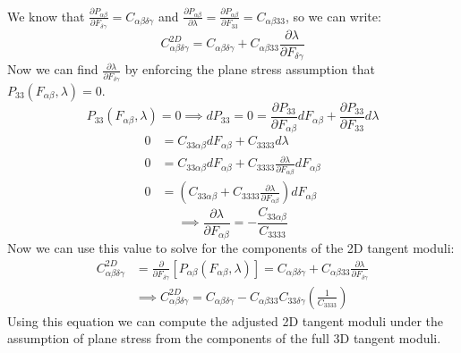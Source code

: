 \documentclass[]{spie}  %
\begin{document}
We know that $\frac{\partial P_{\alpha\beta}}{\partial F_{\delta\gamma}} = C_{\alpha\beta\delta\gamma}$ and $\frac{\partial P_{\alpha\beta}}{\partial \lambda} = \frac{\partial P_{\alpha\beta}}{\partial F_{33}} = C_{\alpha\beta 3 3}$, so we can write:
\begin{equation}
C^{2D}_{\alpha\beta\delta\gamma} = C_{\alpha\beta\delta\gamma} + C_{\alpha\beta 3 3} \frac{\partial \lambda}{\partial F_{\delta\gamma}}
\end{equation}
Now we can find $\frac{\partial \lambda}{\partial F_{\delta\gamma}}$ by enforcing the plane stress assumption that $P_{33}(F_{\alpha\beta}, \lambda) = 0$. 
\begin{equation}
P_{33}(F_{\alpha\beta}, \lambda) = 0 \implies dP_{33} = 0 = \frac{\partial P_{33}}{\partial F_{\alpha\beta}} dF_{\alpha\beta} + \frac{\partial P_{33}}{\partial F_{33}} d\lambda
\end{equation}
\begin{align}
0 &= C_{3 3 \alpha\beta} dF_{\alpha\beta} + C_{3333} d\lambda \\
0 &= C_{3 3 \alpha\beta} dF_{\alpha\beta} + C_{3333} \frac{\partial \lambda}{\partial F_{\alpha\beta}} dF_{\alpha\beta} \\
0 &= \left( C_{3 3 \alpha\beta} + C_{3333} \frac{\partial \lambda}{\partial F_{\alpha\beta}} \right) dF_{\alpha\beta}
\end{align}
\begin{equation}
\implies \frac{\partial \lambda}{\partial F_{\alpha\beta}} = - \frac{C_{3 3 \alpha\beta}}{C_{3333}}
\end{equation}
Now we can use this value to solve for the components of the 2D tangent moduli:
\begin{align}
C^{2D}_{\alpha\beta\delta\gamma} &= \frac{\partial}{\partial F_{\delta\gamma}} \left[ P_{\alpha\beta}(F_{\alpha\beta},
\lambda)\right] = C_{\alpha\beta\delta\gamma} + C_{\alpha\beta 3 3} \frac{\partial \lambda}{\partial F_{\delta\gamma}} \\
& \implies C^{2D}_{\alpha\beta\delta\gamma} = C_{\alpha\beta\delta\gamma} - C_{\alpha\beta 3 3} C_{3 3 \delta\gamma} \left(\frac{1}{C_{3333}}\right)
\label{eq: 2d tangent moduli}
\end{align}
Using this equation we can compute the adjusted 2D tangent moduli under the assumption of plane stress from the components of the full 3D tangent moduli. 
\end{document}
